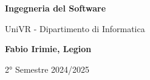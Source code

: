 \begin{titlepage}
	\begin{center}
		\vspace*{1cm}

		\Huge
    \textbf{Ingegneria del Software}

		\vspace{0.5cm}
		\LARGE
		UniVR - Dipartimento di Informatica

		\vspace{1.5cm}

		\textbf{Fabio Irimie, Legion}

		\vfill


		\vspace{0.8cm}


		2° Semestre 2024/2025

	\end{center}
\end{titlepage}
